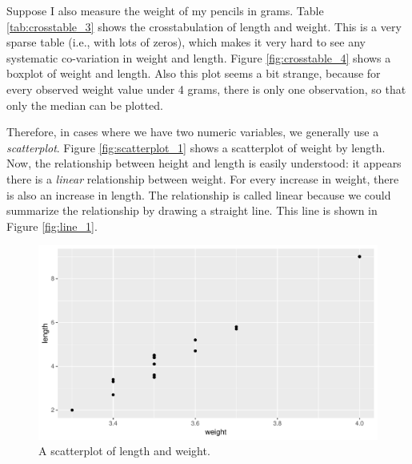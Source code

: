 \documentclass[]{book}\usepackage[]{graphicx}\usepackage[]{color}
\makeatletter
\def\maxwidth{ %
  \ifdim\Gin@nat@width>\linewidth
    \linewidth
  \else
    \Gin@nat@width
  \fi
}
\makeatother
\begin{document}
Suppose I also measure the weight of my pencils in grams. Table \ref{tab:crosstable_3} shows the crosstabulation of length and weight. This is a very sparse table (i.e., with lots of zeros), which makes it very hard to see any systematic co-variation in weight and length. Figure \ref{fig:crosstable_4} shows a boxplot of weight and length. Also this plot seems a bit strange, because for every observed weight value under 4 grams, there is only one observation, so that only the median can be plotted.


Therefore, in cases where we have two numeric variables, we generally use a \textit{scatterplot}. Figure \ref{fig:scatterplot_1} shows a scatterplot of weight by length. Now, the relationship between height and length is easily understood: it appears there is a \textit{linear} relationship between weight. For every increase in weight, there is also an increase in length. The relationship is called linear because we could summarize the relationship by drawing a straight line. This line is shown in Figure \ref{fig:line_1}.


\begin{figure}

{\centering \includegraphics[width=\maxwidth]{figure/scatter_1-1} 

}

\caption[A scatterplot of length and weight]{A scatterplot of length and weight.}\label{fig:scatter_1}
\end{figure}
\end{document}

